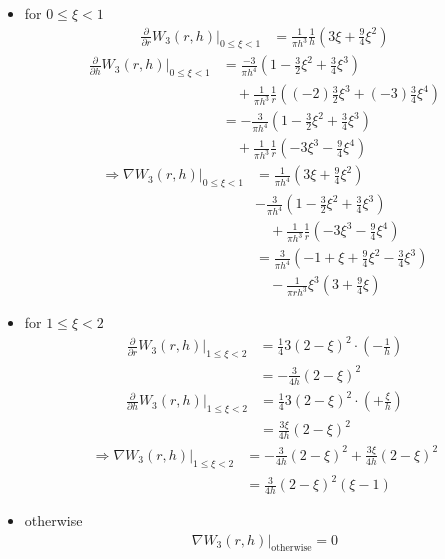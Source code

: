 \documentclass{sigchi}
\begin{document}
\begin{itemize}
	\item for $0 \le \xi < 1$
		\begin{align*}
			\frac{\partial}{\partial r} W_3(r,h)|_{0 \le \xi < 1}
			&= \frac{1}{\pi h^3} \frac{1}{h} \left( 3 \xi + \frac{9}{4} \xi^2 \right)
		\end{align*}
		\begin{align*}
			\frac{\partial}{\partial h} W_3(r,h)|_{0 \le \xi < 1}
			&= \frac{-3}{\pi h^4} \left( 1 - \frac{3}{2} \xi^2 + \frac{3}{4} \xi^3 \right) \\
			&\quad + \frac{1}{\pi h^3} \frac{1}{r} \left( (-2) \frac{3}{2} \xi^3 + (-3)\frac{3}{4} \xi^4 \right) \\
			&= - \frac{3}{\pi h^4} \left( 1 - \frac{3}{2} \xi^2 + \frac{3}{4} \xi^3 \right) \\
			&\quad + \frac{1}{\pi h^3} \frac{1}{r} \left( -3 \xi^3 -\frac{9}{4} \xi^4 \right)
		\end{align*}
		\begin{align*}
			\Rightarrow \nabla W_3(r,h)|_{0 \le \xi < 1}
		&= \frac{1}{\pi h^4} \left( 3 \xi + \frac{9}{4} \xi^2 \right) \\
			&- \frac{3}{\pi h^4} \left( 1 - \frac{3}{2} \xi^2 + \frac{3}{4} \xi^3 \right) \\
			&\quad + \frac{1}{\pi h^3} \frac{1}{r} \left( -3 \xi^3 -\frac{9}{4} \xi^4 \right) \\
		&= \frac{3}{\pi h^4} \left( -1 + \xi + \frac{9}{4} \xi^2
			- \frac{3}{4} \xi^3 \right) \\
			&\quad - \frac{1}{\pi r h^3} \xi^3 \left( 3 + \frac{9}{4} \xi \right)
	\end{align*}
	\item for $1 \le \xi < 2$
		\begin{align*}
			\frac{\partial}{\partial r} W_3(r,h)|_{1 \le \xi < 2}
			&= \frac{1}{4} 3(2-\xi)^2 \cdot \left( -\frac{1}{h} \right) \\
			&= -\frac{3}{4h} (2-\xi)^2
		\end{align*}
		\begin{align*}
			\frac{\partial}{\partial h} W_3(r,h)|_{1 \le \xi < 2}
			&= \frac{1}{4} 3(2-\xi)^2 \cdot \left( +\frac{\xi}{h} \right) \\
			&= \frac{3 \xi}{4 h} (2-\xi)^2
		\end{align*}
		\begin{align*}
			\Rightarrow \nabla W_3(r,h)|_{1 \le \xi < 2}
			&= -\frac{3}{4h} (2-\xi)^2
			+ \frac{3 \xi}{4 h} (2-\xi)^2 \\
			&= \frac{3}{4h} (2-\xi)^2 (\xi - 1)
		\end{align*}
	\item otherwise
		\begin{align*}
			\nabla W_3(r,h)|_{\text{otherwise}} = 0
		\end{align*}
\end{itemize}
\end{document}
